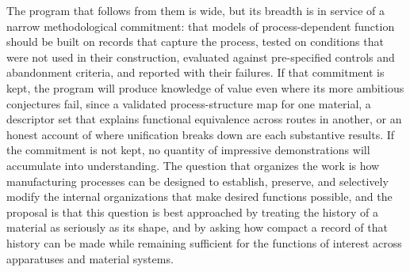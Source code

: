 \documentclass[11pt]{article}
\theoremstyle{definition}
\begin{document}
The program that follows from them is wide, but its breadth is in service of a narrow methodological commitment: that models of process-dependent function should be built on records that capture the process, tested on conditions that were not used in their construction, evaluated against pre-specified controls and abandonment criteria, and reported with their failures. If that commitment is kept, the program will produce knowledge of value even where its more ambitious conjectures fail, since a validated process-structure map for one material, a descriptor set that explains functional equivalence across routes in another, or an honest account of where unification breaks down are each substantive results. If the commitment is not kept, no quantity of impressive demonstrations will accumulate into understanding. The question that organizes the work is how manufacturing processes can be designed to establish, preserve, and selectively modify the internal organizations that make desired functions possible, and the proposal is that this question is best approached by treating the history of a material as seriously as its shape, and by asking how compact a record of that history can be made while remaining sufficient for the functions of interest across apparatuses and material systems.
\end{document}
